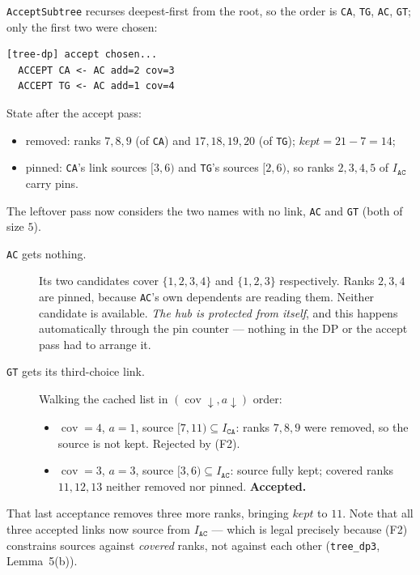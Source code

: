 \documentclass[11pt,a4paper]{article}
\theoremstyle{definition}
\theoremstyle{plain}
\theoremstyle{remark}
\newcommand{\cov}{\operatorname{cov}}
\begin{document}
\texttt{AcceptSubtree} recurses deepest-first from the root, so the
order is \texttt{CA}, \texttt{TG}, \texttt{AC}, \texttt{GT}; only the
first two were chosen:

\begin{verbatim}
[tree-dp] accept chosen...
  ACCEPT CA <- AC add=2 cov=3
  ACCEPT TG <- AC add=1 cov=4
\end{verbatim}

State after the accept pass:
\begin{itemize}
\item removed: ranks $7,8,9$ (of \texttt{CA}) and $17,18,19,20$ (of
  \texttt{TG}); $\mathit{kept} = 21 - 7 = 14$;
\item pinned: \texttt{CA}'s link sources $[3,6)$ and \texttt{TG}'s
  sources $[2,6)$, so ranks $2,3,4,5$ of $I_{\mathtt{AC}}$ carry pins.
\end{itemize}

The leftover pass now considers the two names with no link, \texttt{AC}
and \texttt{GT} (both of size $5$).

\begin{description}
\item[\texttt{AC} gets nothing.] Its two candidates cover
  $\{1,2,3,4\}$ and $\{1,2,3\}$ respectively. Ranks $2,3,4$ are pinned,
  because \texttt{AC}'s own dependents are reading them. Neither
  candidate is available. \emph{The hub is protected from itself}, and
  this happens automatically through the pin counter --- nothing in the
  DP or the accept pass had to arrange it.
\item[\texttt{GT} gets its third-choice link.] Walking the cached list
  in $(\cov \downarrow, a \downarrow)$ order:
  \begin{itemize}
    \item $\cov = 4$, $a = 1$, source $[7,11) \subseteq
      I_{\mathtt{CA}}$: ranks $7,8,9$ were removed, so the source is not
      kept. Rejected by (F2).
    \item $\cov = 3$, $a = 3$, source $[3,6) \subseteq I_{\mathtt{AC}}$:
      source fully kept; covered ranks $11,12,13$ neither removed nor
      pinned. \textbf{Accepted.}
  \end{itemize}
\end{description}

That last acceptance removes three more ranks, bringing $\mathit{kept}$
to $11$. Note that all three accepted links now source from
$I_{\mathtt{AC}}$ --- which is legal precisely because (F2) constrains
sources against \emph{covered} ranks, not against each other
(\texttt{tree\_dp3}, Lemma~5(b)).
\end{document}
